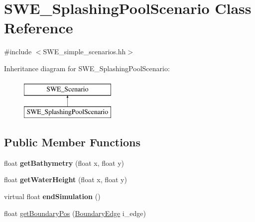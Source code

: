 \hypertarget{classSWE__SplashingPoolScenario}{\section{S\-W\-E\-\_\-\-Splashing\-Pool\-Scenario Class Reference}
\label{classSWE__SplashingPoolScenario}
}


{\ttfamily \#include $<$S\-W\-E\-\_\-simple\-\_\-scenarios.\-hh$>$}

Inheritance diagram for S\-W\-E\-\_\-\-Splashing\-Pool\-Scenario\-:\begin{figure}[H]
\begin{center}
\leavevmode
\includegraphics[height=2.000000cm]{classSWE__SplashingPoolScenario}
\end{center}
\end{figure}
\subsection*{Public Member Functions}
\begin{DoxyCompactItemize}
\item 
\hypertarget{classSWE__SplashingPoolScenario_a75c48073eb863d52fe38639ff0834e72}{float {\bfseries get\-Bathymetry} (float x, float y)}\label{classSWE__SplashingPoolScenario_a75c48073eb863d52fe38639ff0834e72}

\item 
\hypertarget{classSWE__SplashingPoolScenario_a45328d2cbff3068f6bde34d92dff0d1c}{float {\bfseries get\-Water\-Height} (float x, float y)}\label{classSWE__SplashingPoolScenario_a45328d2cbff3068f6bde34d92dff0d1c}

\item 
\hypertarget{classSWE__SplashingPoolScenario_a49edaef6fbfad67c12f0ce1942e9f848}{virtual float {\bfseries end\-Simulation} ()}\label{classSWE__SplashingPoolScenario_a49edaef6fbfad67c12f0ce1942e9f848}

\item 
float \hyperlink{classSWE__SplashingPoolScenario_af9ca3bce236a98e2a7ee5165088c8ed6}{get\-Boundary\-Pos} (\hyperlink{SWE__Scenario_8hh_aa5e01e3f7df312f7b9b0d02521141fcc}{Boundary\-Edge} i\-\_\-edge)
\end{DoxyCompactItemize}


